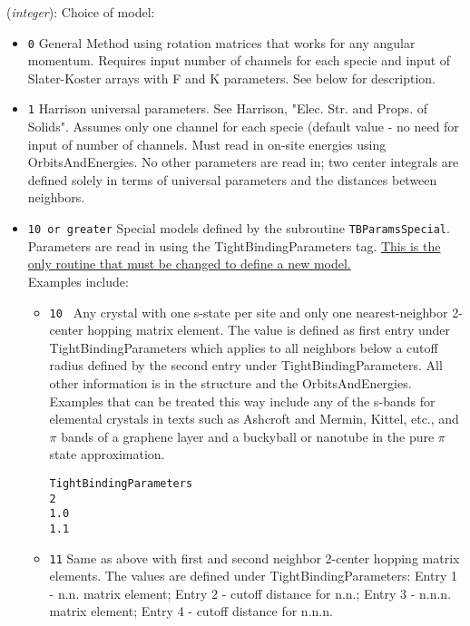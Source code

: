 \begin{description}
\itemsep 10pt
\parsep 0pt


\item[{\bf TightBindingModelType}] ({\it integer}):
 Choice
of model:
\begin{itemize}
\item {\tt 0} General Method using rotation matrices that works
for any angular momentum.  Requires input number of channels for
each specie and input of Slater-Koster arrays with F and K
parameters. See below for description.

\item {\tt 1} Harrison universal parameters. See Harrison, "Elec.
Str. and Props. of Solids". Assumes only one channel for each
specie (default value - no need for input of number of channels.
Must read in on-site energies using OrbitsAndEnergies.  No other
parameters are read in; two center integrals are defined solely in
terms of universal parameters and the distances between neighbors.


\item {\tt 10 or greater} Special models defined by the subroutine
{\tt TBParamsSpecial}.   Parameters are read in using the
TightBindingParameters tag. \underline{This is the only routine
that must be
changed to define a new model.} \\
Examples include:
    \begin{itemize}
\item {\tt 10 } Any crystal with one s-state per site and only one
nearest-neighbor 2-center hopping matrix element.  The value is
defined as first entry under TightBindingParameters which applies
to all neighbors below a cutoff radius defined by the second entry
under TightBindingParameters. All other information is in the
structure and the OrbitsAndEnergies. Examples that can be treated
this way include any of the s-bands for elemental crystals in
texts such as Ashcroft and Mermin, Kittel, etc., and $\pi$ bands
of a graphene layer and a buckyball or nanotube in the pure $\pi$
state approximation.
\begin{verbatim}
TightBindingParameters
2
1.0
1.1
\end{verbatim}

\item {\tt 11} Same as above with first and second neighbor
2-center hopping matrix elements. The values are defined under
TightBindingParameters: Entry 1 - n.n. matrix element; Entry 2 -
cutoff distance for n.n.; Entry 3 - n.n.n. matrix element; Entry 4
- cutoff distance for n.n.n.


\end{itemize}
\end{itemize}
\end{description}
